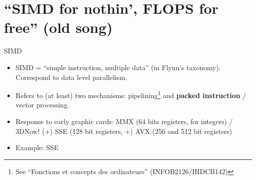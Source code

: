 \section{``SIMD for nothin', FLOPS for free'' (old song)}

\begin{frame}{SIMD}
	\begin{itemize}
		\item SIMD = ``simple instruction, multiple data'' (in Flynn's taxonomy). Correspond to data level parallelism.
		\item Refers to (at least) two mechanisms: pipelining\footnote{See ``Fonctions et concepts des ordinateurs'' (INFOB2126/IHDCB142)} and \textbf{packed instruction} / vector processing.
		\item Response to early graphic cards: MMX (64 bits registers, for integers) / 3DNow! (+) \textrightarrow{} SSE (128 bit registers, +) \textrightarrow{} AVX (256 and 512 bit registers)
		\item Example: SSE\begin{center}
		\end{center}
	\end{itemize}
\end{frame}

